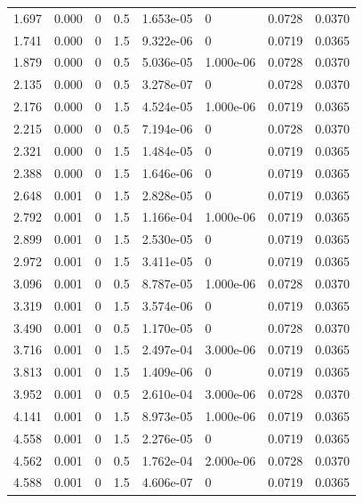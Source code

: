 \documentclass[preview]{standalone}
\begin{document}
{{\begin{tabular}{L{1.2cm}C{1.2cm} C{0.3cm}C{0.5cm} C{1.4cm}C{1.4cm} C{1.4cm}C{1.4cm}}
  1.697  &  0.000  & 0     & 0.5 &  1.653e-05  & 0  & 0.0728 &  0.0370   \\ 
  1.741  &  0.000  & 0     & 1.5 &  9.322e-06  & 0  & 0.0719 &  0.0365   \\ 
  1.879  &  0.000  & 0     & 0.5 &  5.036e-05  & 1.000e-06  & 0.0728 &  0.0370   \\ 
  2.135  &  0.000  & 0     & 0.5 &  3.278e-07  & 0  & 0.0728 &  0.0370   \\ 
  2.176  &  0.000  & 0     & 1.5 &  4.524e-05  & 1.000e-06  & 0.0719 &  0.0365   \\ 
  2.215  &  0.000  & 0     & 0.5 &  7.194e-06  & 0  & 0.0728 &  0.0370   \\ 
  2.321  &  0.000  & 0     & 1.5 &  1.484e-05  & 0  & 0.0719 &  0.0365   \\ 
  2.388  &  0.000  & 0     & 1.5 &  1.646e-06  & 0  & 0.0719 &  0.0365   \\ 
  2.648  &  0.001  & 0     & 1.5 &  2.828e-05  & 0  & 0.0719 &  0.0365   \\ 
  2.792  &  0.001  & 0     & 1.5 &  1.166e-04  & 1.000e-06  & 0.0719 &  0.0365   \\ 
  2.899  &  0.001  & 0     & 1.5 &  2.530e-05  & 0  & 0.0719 &  0.0365   \\ 
  2.972  &  0.001  & 0     & 1.5 &  3.411e-05  & 0  & 0.0719 &  0.0365   \\ 
  3.096  &  0.001  & 0     & 0.5 &  8.787e-05  & 1.000e-06  & 0.0728 &  0.0370   \\ 
  3.319  &  0.001  & 0     & 1.5 &  3.574e-06  & 0  & 0.0719 &  0.0365   \\ 
  3.490  &  0.001  & 0     & 0.5 &  1.170e-05  & 0  & 0.0728 &  0.0370   \\ 
  3.716  &  0.001  & 0     & 1.5 &  2.497e-04  & 3.000e-06  & 0.0719 &  0.0365   \\ 
  3.813  &  0.001  & 0     & 1.5 &  1.409e-06  & 0  & 0.0719 &  0.0365   \\ 
  3.952  &  0.001  & 0     & 0.5 &  2.610e-04  & 3.000e-06  & 0.0728 &  0.0370   \\ 
  4.141  &  0.001  & 0     & 1.5 &  8.973e-05  & 1.000e-06  & 0.0719 &  0.0365   \\ 
  4.558  &  0.001  & 0     & 1.5 &  2.276e-05  & 0  & 0.0719 &  0.0365   \\ 
  4.562  &  0.001  & 0     & 0.5 &  1.762e-04  & 2.000e-06  & 0.0728 &  0.0370   \\ 
  4.588  &  0.001  & 0     & 1.5 &  4.606e-07  & 0  & 0.0719 &  0.0365   \\ 

\end{tabular}}}
\end{document}
